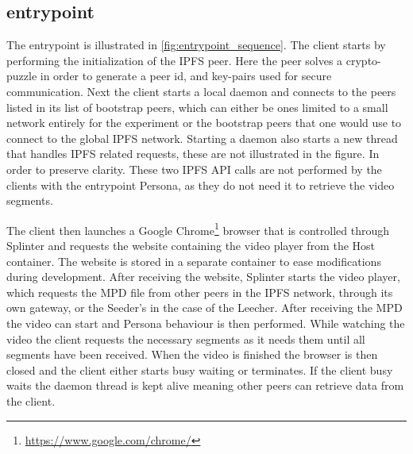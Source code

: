 

\subsection{entrypoint}
\label{sec:experiment_entrypoint}

The entrypoint is illustrated in \autoref{fig:entrypoint_sequence}. The client starts by performing the initialization of the \ac{IPFS} peer. Here the peer solves a crypto-puzzle in order to generate a peer id, and key-pairs used for secure communication.
Next the client starts a local daemon and connects to the peers listed in its list of bootstrap peers, which can either be ones limited to a small network entirely for the experiment or the bootstrap peers that one would use to connect to the global \ac{IPFS} network.
Starting a daemon also starts a new thread that handles \ac{IPFS} related requests, these are not illustrated in the figure. In order to preserve clarity. These two \ac{IPFS} \ac{API} calls are not performed by the clients with the entrypoint Persona, as they do not need it to retrieve the video segments.

The client then launches a Google Chrome\footnote{\url{https://www.google.com/chrome/}} browser that is controlled through Splinter and requests the website containing the video player from the Host container. The website is stored in a separate container to ease modifications during development.
After receiving the website, Splinter starts the video player, which requests the \ac{MPD} file from other peers in the \ac{IPFS} network, through its own gateway, or the Seeder's in the case of the Leecher.
After receiving the \ac{MPD} the video can start and Persona behaviour is then performed. While watching the video the client requests the necessary segments as it needs them until all segments have been received.
When the video is finished the browser is then closed and the client either starts busy waiting or terminates. If the client busy waits the daemon thread is kept alive meaning other peers can retrieve data from the client.



